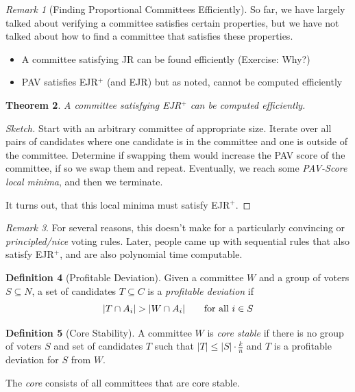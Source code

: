 \documentclass{book}
\theoremstyle{plain}
\newtheorem{theorem}{Theorem}[subsection]
\theoremstyle{definition}
\newtheorem{definition}[theorem]{Definition}
\theoremstyle{remark}
\newtheorem{remark}[theorem]{Remark}
\begin{document}
\begin{remark}[Finding Proportional Committees Efficiently]
    So far, we have largely talked about verifying a committee satisfies 
    certain properties, but we have not talked about how to find a committee that satisfies these properties.

    \begin{itemize}
        \item A committee satisfying JR can be found efficiently (Exercise: Why?)
        \item PAV satisfies EJR$^+$ (and EJR) but as noted, cannot be computed efficiently
    \end{itemize}
\end{remark}

\begin{theorem}
    A committee satisfying EJR$^+$ can be 
    computed efficiently.
\end{theorem}
\begin{proof}[Sketch]
    Start with an arbitrary committee of appropriate size.
    Iterate over all pairs of candidates where one candidate is in the 
    committee and one is outside of the committee.
    Determine if swapping 
    them would increase the PAV score of the committee, if so we swap them and repeat.
    Eventually, we reach some \emph{PAV-Score local minima}, and then we terminate.

    It turns out, that this local minima must satisfy
    EJR$^+$.
\end{proof}

\begin{remark}
    For several reasons, this doesn't make for a particularly convincing or 
    \emph{principled/nice} voting rules.
    Later, people came up with sequential rules that also 
    satisfy 
    EJR$^+$, and are also polynomial time computable.
\end{remark}

\begin{definition}[Profitable Deviation]
    Given a committee 
    $W$ and a group of voters $S \subseteq N$, a set of candidates $T \subseteq C$ is a 
    \emph{profitable deviation} if
    \[
        |T \cap A_i| > |W \cap A_i| \text{\qquad for all $i \in S$}
    \]
\end{definition}

\begin{definition}[Core Stability]
    A committee $W$ is \emph{core stable}
    if there is no group of voters $S$ and set of candidates $T$ such that
    $|T| \leq |S| \cdot \frac{k}{n}$ and $T$ is a profitable deviation for $S$ from $W$.

    The \emph{core} consists of all 
    committees that are core stable.
\end{definition}
\end{document}

